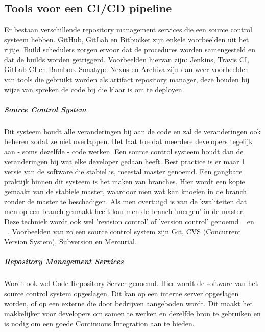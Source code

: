 
\chapter{}
\label{ch:vergelijking-tools}

\section{Tools voor een CI/CD pipeline}
\label{sec:tools-voor-pipeline}
Er bestaan verschillende repository management services die een source control systeem hebben. GitHub, GitLab en Bitbucket zijn enkele voorbeelden uit het rijtje.
Build schedulers zorgen ervoor dat de procedures worden samengesteld en dat de builds worden getriggerd. Voorbeelden hiervan zijn: Jenkins, Travis CI, GitLab-CI en Bamboo. Sonatype Nexus en Archiva zijn dan weer voorbeelden van tools die gebruikt worden als artifact repository manager, deze houden bij wijze van spreken de code bij die klaar is om te deployen. 

\paragraph{Source Control System}
Dit systeem houdt alle veranderingen bij aan de code en zal de veranderingen ook beheren zodat ze niet overlappen. Het laat toe dat meerdere developers tegelijk aan - soms dezelfde - code werken. Een source control systeem houdt dan de veranderingen bij wat elke developer gedaan heeft. Best practice is er maar 1 versie van de software die stabiel is, meestal master genoemd. Een gangbare praktijk binnen dit systeem is het maken van branches. Hier wordt een kopie gemaakt van de stabiele master, waardoor men wat kan knoeien in de branch zonder de master te beschadigen. Als men overtuigd is van de kwaliteiten dat men op een branch gemaakt heeft kan men de branch 'mergen' in de master. Deze techniek wordt ook wel 'revision control' of 'version control' genoemd ~\autocite{Skelton2014} en ~\autocite{Riti2018}.
Voorbeelden van zo een source control system zijn Git, CVS (Concurrent Version System), Subversion en Mercurial.

\paragraph{Repository Management Services}
Wordt ook wel Code Repository Server genoemd. Hier wordt de software van het source control system opgeslagen. Dit kan op een interne server opgeslagen worden, of op een externe die door bedrijven aangeboden wordt. Dit maakt het makkelijker voor developers om samen te werken en dezelfde bron te gebruiken en is nodig om een goede Continuous Integration aan te bieden.

